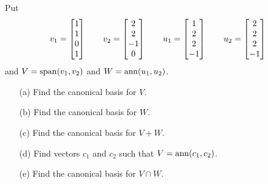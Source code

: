 \documentclass[a4paper]{article}
\begin{document}
\begin{problem}[2011-12]
 Put 
 \[ v_1 = \left[\begin{matrix}  1\\ 1\\ 0\\ 1 \end{matrix}\right] \hspace{2em}
    v_2 = \left[\begin{matrix}  2\\ 2\\-1\\ 0 \end{matrix}\right] \hspace{2em}
    u_1 = \left[\begin{matrix}  1\\ 2\\ 2\\-1 \end{matrix}\right] \hspace{2em}
    u_2 = \left[\begin{matrix}  2\\ 2\\ 2\\-1 \end{matrix}\right]
 \]
 and $V=\operatorname{span}(v_1,v_2)$ and $W=\operatorname{ann}(u_1,u_2)$.  
 \begin{itemize}
  \item[(a)] Find the canonical basis for $V$. 
  \item[(b)] Find the canonical basis for $W$. 
  \item[(c)] Find the canonical basis for $V+W$. 
  \item[(d)] Find vectors $c_1$ and $c_2$ such that
   $V=\operatorname{ann}(c_1,c_2)$. 
  \item[(e)] Find the canonical basis for $V\cap W$. 
 \end{itemize}
\end{problem}
\end{document}
